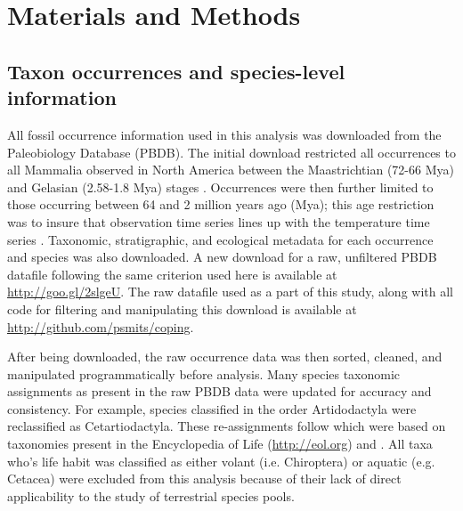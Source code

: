 \documentclass[12pt,letterpaper]{article}
\begin{document}
\section*{Materials and Methods}

\subsection*{Taxon occurrences and species-level information}
All fossil occurrence information used in this analysis was downloaded from the Paleobiology Database (PBDB). The initial download restricted all occurrences to all Mammalia observed in North America between the Maastrichtian (72-66 Mya) and Gelasian (2.58-1.8 Mya) stages \citep{Cohen2015}. Occurrences were then further limited to those occurring between 64 and 2 million years ago (Mya); this age restriction was to insure that observation time series lines up with the temperature time series \citep{Cramer2011}. Taxonomic, stratigraphic, and ecological metadata for each occurrence and species was also downloaded. A new download for a raw, unfiltered PBDB datafile following the same criterion used here is available at \url{http://goo.gl/2slgeU}. The raw datafile used as a part of this study, along with all code for filtering and manipulating this download is available at \url{http://github.com/psmits/coping}.

After being downloaded, the raw occurrence data was then sorted, cleaned, and manipulated programmatically before analysis. Many species taxonomic assignments as present in the raw PBDB data were updated for accuracy and consistency. For example, species classified in the order Artidodactyla were reclassified as Cetartiodactyla. These re-assignments follow \citet{Smits2015b} which were based on taxonomies present in the Encyclopedia of Life (\url{http://eol.org}) and \citet{Janis1998,Janis2008}. All taxa who's life habit was classified as either volant (i.e. Chiroptera) or aquatic (e.g. Cetacea) were excluded from this analysis because of their lack of direct applicability to the study of terrestrial species pools.
\end{document}
